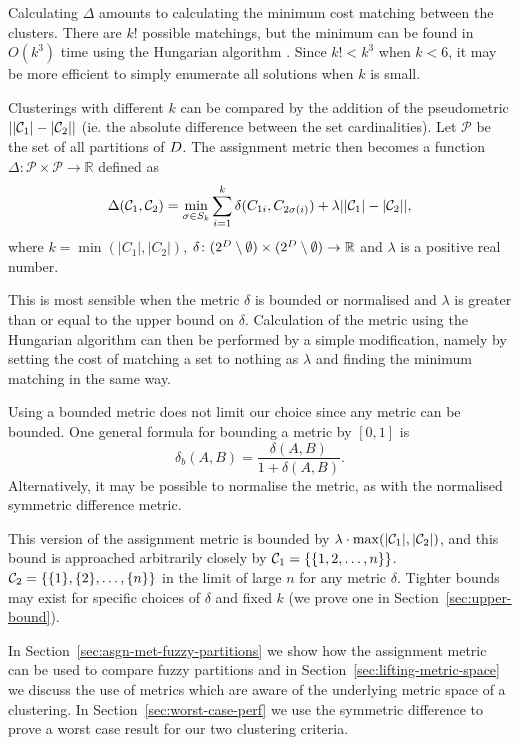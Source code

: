 Calculating $\Delta$ amounts to calculating the minimum cost matching between
the clusters.  There are $k!$ possible matchings, but the minimum can be found
in $O(k^3)$ time using the Hungarian algorithm \cite{kuhn1955hungarian}.
Since $k! < k^3$ when $k < 6$, it may be more efficient to simply enumerate
all solutions when $k$ is small.

Clusterings with different $k$ can be compared by the addition of the
pseudometric $||\mathcal{C}_1|-|\mathcal{C}_2||$ (ie. the absolute difference between the
set cardinalities).  Let $\mathcal{P}$ be the set of all partitions of
$D$.  The assignment metric then becomes a function $\Delta \colon
\mathcal{P} \times \mathcal{P} \to \mathbb{R}$ defined as
\begin{equation*}
  \Delta(\mathcal{C}_1, \mathcal{C}_2)
  = \min_{\sigma \in S_k} \sum_{i=1}^{k} \delta(C_{1i},C_{2\sigma(i)})
  + \lambda ||\mathcal{C}_1|-|\mathcal{C}_2||,
\end{equation*}
where $k = \min(|C_1|,|C_2|)$, $\delta \colon (2^{D}\setminus \emptyset)
\times (2^{D}\setminus \emptyset) \to \mathbb{R}$ and $\lambda$ is a
positive real number.

This is most sensible when the metric $\delta$ is bounded or normalised and
$\lambda$ is greater than or equal to the upper bound on $\delta$.
Calculation of the metric using the Hungarian algorithm can then be performed
by a simple modification, namely by setting the cost of matching a set to
nothing as $\lambda$ and finding the minimum matching in the same way.

Using a bounded metric does not limit our choice since any metric can be
bounded.  One general formula for bounding a metric by $[0,1]$ is
\begin{equation}
  \label{eq:met-bound}
  \delta_b (A,B) = \frac{\delta(A,B)}{1+\delta(A,B)}.
\end{equation}
Alternatively, it may be possible to normalise the metric, as with the
normalised symmetric difference metric.

This version of the assignment metric is bounded by $\lambda \cdot
\max(|\mathcal{C}_1|,|\mathcal{C}_2|)$, and this bound is approached arbitrarily closely
by $\mathcal{C}_1 = \{\{1,2,\dotsc,n\}\}$. $\mathcal{C}_2 = \{\{1\},\{2\},\dotsc,\{n\}\}$
in the limit of large $n$ for any metric $\delta$.  Tighter bounds may exist
for specific choices of $\delta$ and fixed $k$ (we prove one in
Section~\ref{sec:upper-bound}).

In Section~\ref{sec:asgn-met-fuzzy-partitions} we show how the assignment
metric can be used to compare fuzzy partitions and in
Section~\ref{sec:lifting-metric-space} we discuss the use of metrics which are
aware of the underlying metric space of a clustering.  In
Section~\ref{sec:worst-case-perf} we use the symmetric difference to prove a
worst case result for our two clustering criteria.

